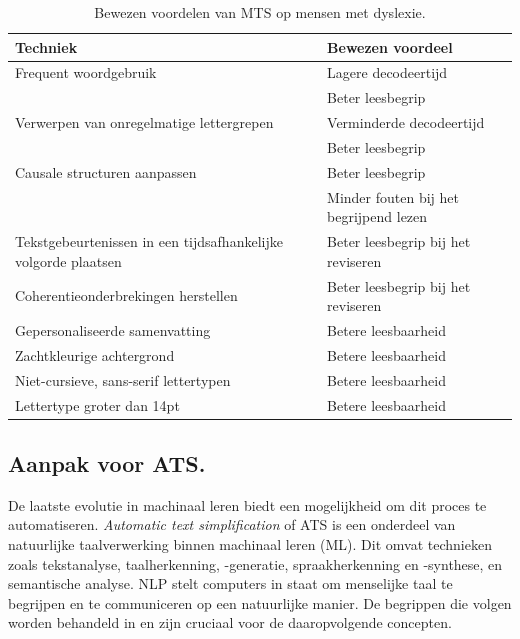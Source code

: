 \begin{center}
	\begin{table}[H]
	\begin{tabular}{ | m{7cm} | m{7cm} | } 
	\hline
	\textbf{Techniek} & \textbf{Bewezen voordeel} \\
	\hline
	Frequent woordgebruik & Lagere decodeertijd \\
	& Beter leesbegrip \\
	\hline	
	Verwerpen van onregelmatige lettergrepen & Verminderde decodeertijd \\
	& Beter leesbegrip \\	
	\hline
	Causale structuren aanpassen & Beter leesbegrip \\
	& Minder fouten bij het begrijpend lezen \\
	\hline	
	Tekstgebeurtenissen in een tijdsafhankelijke volgorde plaatsen & Beter leesbegrip bij het reviseren \\
	\hline
	Coherentieonderbrekingen herstellen & Beter leesbegrip bij het reviseren \\
	\hline
	Gepersonaliseerde samenvatting & Betere leesbaarheid \\
	\hline
	Zachtkleurige achtergrond & Betere leesbaarheid \\
	\hline
	Niet-cursieve, sans-serif lettertypen & Betere leesbaarheid \\
	\hline
	Lettertype groter dan 14pt & Betere leesbaarheid \\
	\hline
	\end{tabular}
	\caption{Bewezen voordelen van MTS op mensen met dyslexie.}
	\label{table:benefits-mts}
	\end{table}
\end{center}

\subsection{Aanpak voor ATS.}

De laatste evolutie in machinaal leren biedt een mogelijkheid om dit proces te automatiseren. \textit{Automatic text simplification} of ATS is een onderdeel van natuurlijke taalverwerking binnen machinaal leren (ML). Dit omvat technieken zoals tekstanalyse, taalherkenning, -generatie, spraakherkenning en -synthese, en semantische analyse. NLP stelt computers in staat om menselijke taal te begrijpen en te communiceren op een natuurlijke manier. De begrippen die volgen worden behandeld in \textcite{Sohom2019, Eisenstein2019} en zijn cruciaal voor de daaropvolgende concepten.

